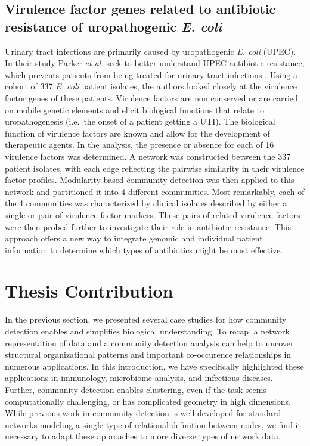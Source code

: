 \subsection{Virulence factor genes related to antibiotic resistance of uropathogenic \emph{E. coli}}
\indent Urinary tract infections are primarily caused by uropathogenic \emph{E. coli} (UPEC). In their study Parker \emph{et al.} seek to better understand UPEC antibiotic resistance, which prevents patients from being treated for urinary tract infections \cite{parker2015network}. Using a cohort of 337 \emph{E. coli} patient isolates, the authors looked closely at the virulence factor genes of these patients. Virulence factors are non conserved or are carried on mobile genetic elements and elicit biological functions that relate to uropathogenesis (i.e.~the onset of a patient getting a UTI). The biological function of virulence factors are known and allow for the development of therapeutic agents. In the analysis, the presence or absence for each of 16 virulence factors was determined. A network was constructed between the 337 patient isolates, with each edge reflecting the pairwise similarity in their virulence factor profiles. Modularity based community detection was then applied to this network and partitioned it into 4 different communities. Most remarkably, each of the 4 communities was characterized by clinical isolates described by either a single or pair of virulence factor markers. These pairs of related virulence factors were then probed further to investigate their role in antibiotic resistance. This approach offers a new way to integrate genomic and individual patient information to determine which types of antibiotics might be most effective.  

\section{Thesis Contribution}
In the previous section, we presented several case studies for how community detection enables and simplifies biological understanding. To recap, a network representation of data and a community detection analysis can help to uncover structural organizational patterns and important co-occurence relationships in numerous applications. In this introduction, we have specifically highlighted these applications in immunology, microbiome analysis, and infectious diseases. Further, community detection enables clustering, even if the task seems computationally challenging, or has complicated geometry in high dimensions. While previous work in community detection is well-developed for standard networks modeling a single type of relational definition between nodes, we find it necessary to adapt these approaches to more diverse types of network data.  


